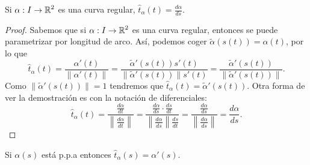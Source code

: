 \begin{prop}
Si $\displaystyle \alpha : I \to \mathbb{R}^{2} $ es una curva regular, $\displaystyle \hat{t}_{\alpha }\left(t\right)= \frac{d\alpha }{d s} $. 
\end{prop}
\begin{proof}
	Sabemos que si $\displaystyle \alpha : I \to \mathbb{R}^{2} $ es una curva regular, entonces se puede parametrizar por longitud de arco. Así, podemos coger $\displaystyle \tilde{\alpha}\left(s\left(t\right)\right)=\alpha\left(t\right) $, por lo que 
	\[\hat{t}_{\alpha }\left(t\right)=\frac{\alpha'\left(t\right)}{\|\alpha'\left(t\right)\|}=\frac{\tilde{\alpha}'\left(s\left(t\right)\right)s'\left(t\right)}{\|\tilde{\alpha}'\left(s\left(t\right)\right)\| s'\left(t\right)} = \frac{\tilde{\alpha}'\left(s\left(t\right)\right)}{\|\tilde{\alpha}'\left(s\left(t\right)\right)\|} .\]
	Como $\displaystyle \|\tilde{\alpha}'\left(s\left(t\right)\right)\| = 1 $ tendremos que $\displaystyle \hat{t}_{\alpha }\left(t\right)=\tilde{\alpha}'\left(s\left(t\right)\right) $. Otra forma de ver la demostración es con la notación de diferenciales:
	\[\hat{t}_{\alpha }\left(t\right)=\frac{\frac{d\alpha }{dt}}{\left\|\frac{d\alpha }{dt}\right\|}= \frac{\frac{d\alpha }{d s} \cdot \frac{d s}{dt}}{\left\|\frac{d\alpha }{d s}\right\|\frac{d s}{dt}} = \frac{\frac{d\alpha }{d s}}{\left\|\frac{d\alpha }{d s}\right\|}= \frac{d\alpha }{d s}.\]
\end{proof}

\begin{observation}
Si $\displaystyle \alpha \left(s\right) $ está p.p.a entonces $\displaystyle \hat{t}_{\alpha }\left(s\right)=\alpha'\left(s\right) $. 
\end{observation}

